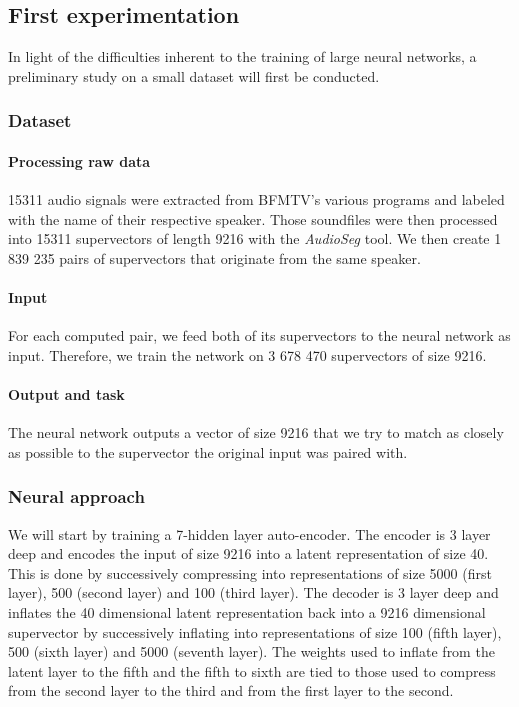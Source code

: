 \documentclass[conference]{IEEEtran}
\begin{document}
\subsection{First experimentation}

In light of the difficulties inherent to the training of large neural networks,
a preliminary study on a small dataset will first be conducted.

\subsubsection{Dataset}

\paragraph{Processing raw data}

15311 audio signals were extracted from BFMTV's various programs and labeled
with the name of their respective speaker. Those soundfiles were then processed
into 15311 supervectors of length 9216 with the \emph{AudioSeg} tool.
We then create 1 839 235 pairs of supervectors that originate from the same
speaker.

\paragraph{Input}

For each computed pair, we feed both of its supervectors to the neural network as
input. Therefore, we train the network on 3 678 470 supervectors of size 9216.

\paragraph{Output and task}

The neural network outputs a vector of size 9216 that we try to match as closely
as possible to the supervector the original input was paired with.

\subsubsection{Neural approach}

We will start by training a 7-hidden layer auto-encoder.
The encoder is 3 layer
deep and encodes the input of size 9216 into a latent representation of size 40.
This is done by successively compressing into representations of size 5000
(first layer), 500 (second layer) and 100 (third layer).
The decoder is 3 layer deep and inflates the 40 dimensional latent
representation back into a 9216 dimensional supervector by successively
inflating into representations of size 100 (fifth layer), 500 (sixth layer) and
5000 (seventh layer). The weights used to inflate from the latent layer to the
fifth and the fifth to sixth are tied to those used to compress from the second
layer to the third and from the first
layer to the second.
\end{document}
